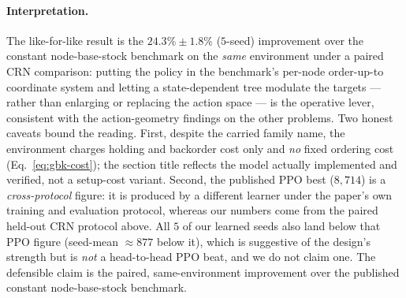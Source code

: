 \documentclass[11pt]{article}
\begin{document}
\paragraph{Interpretation.}
The like-for-like result is the $24.3\%\pm1.8\%$ ($5$-seed) improvement over the constant node-base-stock
benchmark on the \emph{same} environment under a paired CRN comparison: putting the policy in the
benchmark's per-node order-up-to coordinate system and letting a state-dependent tree modulate the
targets --- rather than enlarging or replacing the action space --- is the operative lever, consistent
with the action-geometry findings on the other problems. Two honest caveats bound the reading. First,
despite the carried family name, the environment charges holding and backorder cost only and \emph{no}
fixed ordering cost (Eq.~\eqref{eq:gbk-cost}); the section title reflects the model actually
implemented and verified, not a setup-cost variant. Second, the published PPO best ($8{,}714$) is a
\emph{cross-protocol} figure: it is produced by a different learner under the paper's own training and
evaluation protocol, whereas our numbers come from the paired held-out CRN protocol above. All $5$ of our
learned seeds also land below that PPO figure (seed-mean $\approx 877$ below it), which is suggestive of
the design's strength but is \emph{not} a head-to-head PPO beat, and we do not claim one. The defensible
claim is the paired, same-environment improvement over the published constant node-base-stock benchmark.
\end{document}
